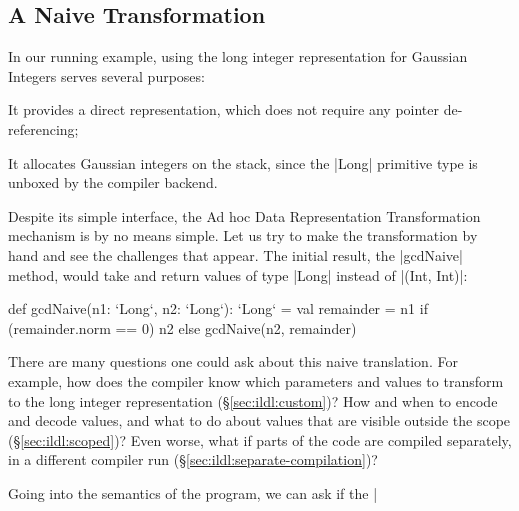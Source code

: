 
\subsection{A Naive Transformation}


In our running example, using the long integer representation for Gaussian Integers serves several purposes:

\begin{compactitem}
  \item It provides a direct representation, which does not require any pointer de-referencing;
  \item It allocates Gaussian integers on the stack, since the |Long| primitive type is unboxed by the compiler backend.
\end{compactitem}

Despite its simple interface, the Ad hoc Data Representation Transformation mechanism is by no means simple. Let us try to make the transformation by hand and see the challenges that appear. The initial result, the |gcdNaive| method, would take and return values of type |Long| instead of |(Int, Int)|:

\begin{lstlisting-nobreak}
def gcdNaive(n1: `Long`, n2: `Long`): `Long` = {
  val remainder = n1 %
  if (remainder.norm == 0) n2 else gcdNaive(n2, remainder)
}
\end{lstlisting-nobreak}

There are many questions one could ask about this naive translation. For example, how does the compiler know which parameters and values to transform to the long integer representation (\S\ref{sec:ildl:custom})? How and when to encode and decode values, and what to do about values that are visible outside the scope (\S\ref{sec:ildl:scoped})? Even worse, what if parts of the code are compiled separately, in a different compiler run (\S\ref{sec:ildl:separate-compilation})?

Going into the semantics of the program, we can ask if the |%

